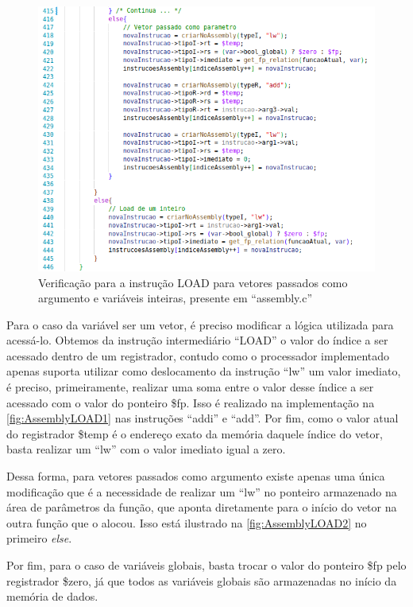 \documentclass[
	12pt,				%
	oneside,
	a4paper,			%
	english,			%
	french,				%
	spanish,			%
	brazil,				%
	]{abntex2}
\begin{document}
\begin{figure}[htbp]
\centering 
\caption{Verificação para a instrução LOAD para vetores passados como argumento e variáveis inteiras, presente em \nohyphens{``assembly.c''}} 
\label{fig:AssemblyLOAD2}
\graphicspath{ {./imgs/} } 
\includegraphics[scale=0.5]{imgs/Codigo/Assembly_LOAD_Inteiros.png}
\end{figure}

Para o caso da variável ser um vetor, é preciso modificar a lógica utilizada para acessá-lo. Obtemos da instrução intermediário ``LOAD'' o valor do índice a ser acessado dentro de um registrador, contudo como o processador implementado apenas suporta utilizar como deslocamento da instrução ``lw'' um valor imediato, é preciso, primeiramente, realizar uma soma entre o valor desse índice a ser acessado com o valor do ponteiro \$fp. Isso é realizado na implementação na \autoref{fig:AssemblyLOAD1} nas instruções ``addi'' e ``add''. Por fim, como o valor atual do registrador \$temp é o endereço exato da memória daquele índice do vetor, basta realizar um ``lw'' com o valor imediato igual a zero.

Dessa forma, para vetores passados como argumento existe apenas uma única modificação que é a necessidade de realizar um ``lw'' no ponteiro armazenado na área de parâmetros da função, que aponta diretamente para o início do vetor na outra função que o alocou. Isso está ilustrado na \autoref{fig:AssemblyLOAD2} no primeiro \emph{else}.


Por fim, para o caso de variáveis globais, basta trocar o valor do ponteiro \$fp pelo registrador \$zero, já que todos as variáveis globais são armazenadas no início da memória de dados.
\end{document}
